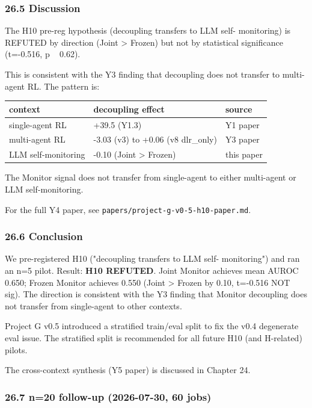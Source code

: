 \documentclass[11pt]{article}
\begin{document}
\subsubsection{26.5 Discussion}

The H10 pre-reg hypothesis (decoupling transfers to LLM self-
monitoring) is REFUTED by direction (Joint > Frozen) but not by
statistical significance (t=-0.516, p ~ 0.62).

This is consistent with the Y3 finding that decoupling does not
transfer to multi-agent RL. The pattern is:

\begin{tabular}{lll}
context & decoupling effect & source \\
\hline
single-agent RL & +39.5 (Y1.3) & Y1 paper \\
multi-agent RL & -3.03 (v3) to +0.06 (v8 dlr\_only) & Y3 paper \\
LLM self-monitoring & -0.10 (Joint > Frozen) & this paper \\
\end{tabular}


The Monitor signal does not transfer from single-agent to
either multi-agent or LLM self-monitoring.

For the full Y4 paper, see \texttt{papers/project-g-v0-5-h10-paper.md}.

\subsubsection{26.6 Conclusion}

We pre-registered H10 ("decoupling transfers to LLM self-
monitoring") and ran an n=5 pilot. Result: \textbf{H10 REFUTED}.
Joint Monitor achieves mean AUROC 0.650; Frozen Monitor achieves
0.550 (Joint > Frozen by 0.10, t=-0.516 NOT sig). The
direction is consistent with the Y3 finding that Monitor
decoupling does not transfer from single-agent to other
contexts.

Project G v0.5 introduced a stratified train/eval split to
fix the v0.4 degenerate eval issue. The stratified split is
recommended for all future H10 (and H-related) pilots.

The cross-context synthesis (Y5 paper) is discussed in
Chapter 24.

\subsubsection{26.7 n=20 follow-up (2026-07-30, 60 jobs)}
\end{document}
